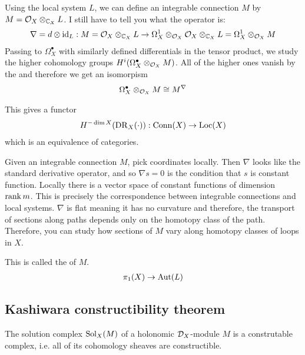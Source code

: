 Using the local system $L$, we can define an integrable connection $M$
by $M = {\mathcal{O}}_X\otimes_{\mathbb{C}_X} L$. I still have to tell you what the operator is: \begin{align*}
	\nabla = d\otimes \operatorname{id}_L : M = {\mathcal{O}}_X\otimes_{\mathbb{C}_X} L \to \Omega_X^1\otimes_{{\mathcal{O}}_X} {\mathcal{O}}_X\otimes_{\mathbb{C}_X} L = \Omega_X^1\otimes_{{\mathcal{O}}_X} M
\end{align*} Passing to $\Omega_X^\bullet$ with similarly defined differentials
in the tensor product, we study
the higher cohomology groups $H^i(\Omega_X^\bullet\otimes_{{\mathcal{O}}_X} M)$. All of the higher ones
vanish by the  and therefore we get an isomorpism \begin{align*}
	\Omega_X^\bullet\otimes_{{\mathcal{O}}_X} M \cong M^\nabla
\end{align*}

This gives a functor \begin{align*}
	H^{-\dim X}(\operatorname{DR}_X(\cdot)): \operatorname{Conn}(X) \to \operatorname{Loc}(X)
\end{align*} which is an equivalence of categories.

\begin{remark}
	Given an integrable connection $M$, pick coordinates locally. Then $\nabla$
	looks like the standard derivative operator, and so $\nabla s = 0$ is the condition
	that $s$ is constant function. Locally there is a vector space of constant functions
	of dimension $\operatorname{rank} m$. This is precisely the correspondence
	between integrable connections and local systems. $\nabla$ is flat meaning it
	has no curvature and therefore, the transport of sections along paths depends
	only on the homotopy class of the path. Therefore, you can study how sections
	of $M$ vary along homotopy classes of loops in $X$.

	\hfill

	This is called the  of $M$.\begin{align*}
		\pi_1(X) \to \operatorname{Aut}(L)
	\end{align*}
\end{remark}
\subsection{Kashiwara constructibility theorem}
\begin{theorem}[Kashiwara]
	The solution complex $\operatorname{Sol}_X(M)$ of a holonomic ${\mathcal{D}}_X$-module $M$
	is a construtable complex, i.e. all of its cohomology sheaves are
	constructible.
\end{theorem}


